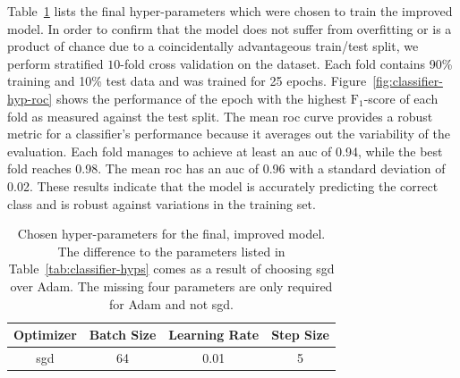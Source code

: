 \documentclass[draft,final]{vutinfth} %
\begin{document}
Table~\ref{tab:classifier-final-hyps} lists the final hyper-parameters
which were chosen to train the improved model. In order to confirm
that the model does not suffer from overfitting or is a product of
chance due to a coincidentally advantageous train/test split, we
perform stratified $10$-fold cross validation on the dataset. Each
fold contains 90\% training and 10\% test data and was trained for 25
epochs. Figure~\ref{fig:classifier-hyp-roc} shows the performance of
the epoch with the highest $\mathrm{F}_1$-score of each fold as
measured against the test split. The mean \gls{roc} curve provides a
robust metric for a classifier's performance because it averages out
the variability of the evaluation. Each fold manages to achieve at
least an \gls{auc} of 0.94, while the best fold reaches 0.98. The mean
\gls{roc} has an \gls{auc} of 0.96 with a standard deviation of
0.02. These results indicate that the model is accurately predicting
the correct class and is robust against variations in the training
set.

\begin{table}
  \centering
  \begin{tabular}{cccc}
    \toprule
    Optimizer &  Batch Size & Learning Rate & Step Size \\
    \midrule
    \gls{sgd} & 64 & 0.01 & 5\\
    \bottomrule
  \end{tabular}
  \caption[Hyper-parameters for the optimized classifier.]{Chosen
    hyper-parameters for the final, improved model. The difference to
    the parameters listed in Table~\ref{tab:classifier-hyps} comes as
    a result of choosing \gls{sgd} over Adam. The missing four
    parameters are only required for Adam and not \gls{sgd}.}
  \label{tab:classifier-final-hyps}
\end{table}
\end{document}
